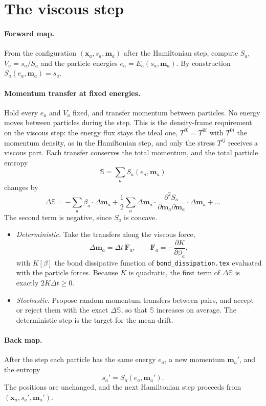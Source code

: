 \documentclass[11pt,aps,preprint,nofootinbib,superscriptaddress,tightenlines]{revtex4-2}
\def\st{\begin{equation}}
\def\stp{\end{equation}}
\let\oldparagraph\paragraph
\renewcommand{\paragraph}{\par\bigskip\oldparagraph}
\begin{document}
\section{The viscous step}
\label{sec:step}

\paragraph{Forward map.}  From the configuration $(\bm x_a,s_a,\bm m_a)$ after
the Hamiltonian step, compute $S_a$, $V_a=s_a/S_a$ and the particle energies
$e_a=E_a(s_a,\bm m_a)$.  By construction $S_a(e_a,\bm m_a)=s_a$.

\paragraph{Momentum transfer at fixed energies.}  Hold every $e_a$ and $V_a$
fixed, and transfer momentum between particles.  No energy moves between
particles during the step.  This is the density-frame requirement on the
viscous step: the energy flux stays the ideal one, $T^{i0}=T^{0i}$ with $T^{0i}$
the momentum density, as in the Hamiltonian step, and only the stress $T^{ij}$
receives a viscous part.  Each transfer conserves the total momentum, and the
total particle entropy
\st
\mathbb S=\sum_aS_a(e_a,\bm m_a)
\stp
changes by
\st
\Delta\mathbb S=-\sum_a\beta_a\cdot\Delta\bm m_a
+\frac12\sum_a\Delta\bm m_a\cdot\frac{\partial^2S_a}{\partial\bm m_a\partial\bm m_a}\cdot\Delta\bm m_a+\dots
\stp
The second term is negative, since $S_a$ is concave.
\begin{itemize}
\item \emph{Deterministic.}  Take the transfers along the viscous force,
  \st
  \Delta\bm m_a=\Delta t\,\bm F_a,\qquad \bm F_a=-\frac{\partial K}{\partial\beta_a},
  \label{step}
  \stp
  with $K[\beta]$ the bond dissipative function of \texttt{bond\_dissipation.tex}
  evaluated with the particle forces.  Because $K$ is quadratic, the first term
  of $\Delta\mathbb S$ is exactly $2K\Delta t\ge0$.
\item \emph{Stochastic.}  Propose random momentum transfers between pairs, and
  accept or reject them with the exact $\Delta\mathbb S$, so that $\mathbb S$
  increases on average.  The deterministic step is the target for the mean
  drift.
\end{itemize}

\paragraph{Back map.}  After the step each particle has the same energy $e_a$, a
new momentum $\bm m_a'$, and the entropy
\st
s_a'=S_a(e_a,\bm m_a') .
\stp
The positions are unchanged, and the next Hamiltonian step proceeds from
$(\bm x_a,s_a',\bm m_a')$.
\end{document}
